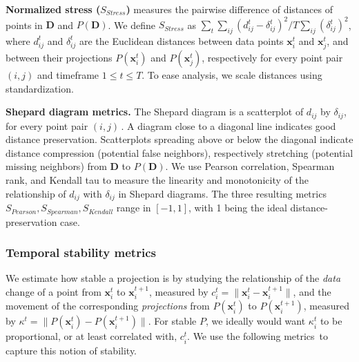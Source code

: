 
\noindent\textbf{Normalized stress ($S_{Stress}$)} measures the pairwise difference of distances of points in $\mathbf{D}$ and $P(\mathbf{D})$. We define $S_{Stress}$ as $\sum_t \sum_{ij}(d_{ij}^t - {\delta_{ij}^t})^{2} / T\sum_{ij} (\delta_{ij}^t)^{2}$, where $d_{ij}^t$ and ${\delta_{ij}^t}$ are the Euclidean distances between data points $\mathbf{x}_i^t$ and $\mathbf{x}_j^t$, and between their projections $P(\mathbf{x}_i^t)$ and $P(\mathbf{x}_j^t)$, respectively for every point pair $(i,j)$ and timeframe $1 \leq t \leq T$. To ease analysis, we scale distances using standardization.

\noindent\textbf{Shepard diagram metrics.} The Shepard diagram is a scatterplot of $d_{ij}$ by $\delta_{ij}$, for every point pair $(i,j)$\,\citep{Joia2011}. A diagram close to a diagonal line indicates good distance preservation.
Scatterplots spreading above or below the diagonal indicate distance compression (potential false neighbors), respectively stretching (potential missing neighbors) from $\mathbf{D}$ to $P(\mathbf{D})$. We use Pearson correlation, Spearman rank, and Kendall tau to measure the linearity and monotonicity of the relationship of $d_{ij}$ with $\delta_{ij}$ in Shepard diagrams. The three resulting metrics $S_{Pearson}, S_{Spearman}, S_{Kendall}$ range in $[-1,1]$, with 1 being the ideal distance-preservation case.


\subsubsection{Temporal stability metrics}
%
We estimate how stable a projection is by studying the relationship of the \emph{data} change of a point from $\mathbf{x}_i^t$ to $\mathbf{x}_i^{t+1}$, measured by $ c_i^t = \|\mathbf{x}_i^t - \mathbf{x}_i^{t+1}\|$, 
and the movement of the corresponding \emph{projections} from $P(\mathbf{x}_i^t)$ to $P(\mathbf{x}_i^{t+1})$, measured by $ \kappa^t = \|P(\mathbf{x}_i^t) - P(\mathbf{x}_i^{t+1})\|$. 
For stable $P$, we ideally would want $\kappa_i^t$ to be proportional, or at least correlated with, $c_i^t$. We use the following metrics\,\citep{Vernier2020} to capture this notion of stability.


